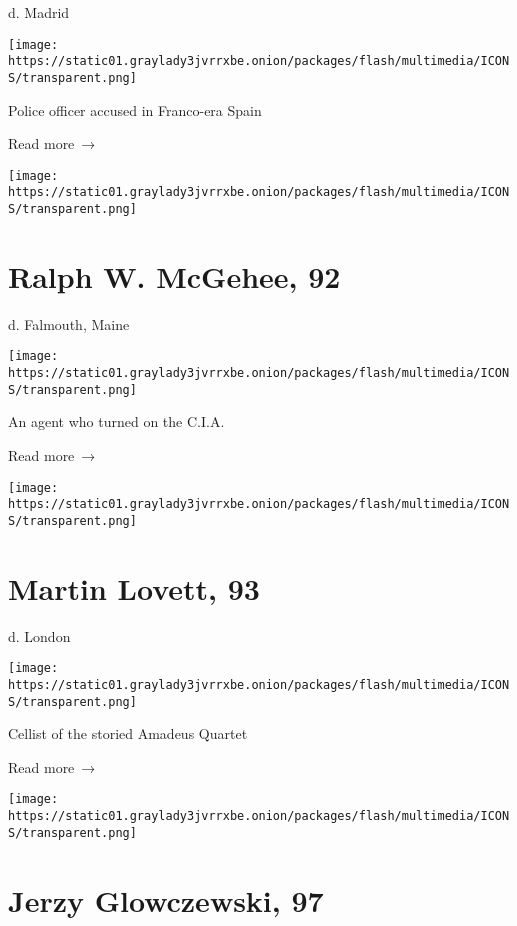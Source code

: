 d. Madrid

\texttt{[image: https://static01.graylady3jvrrxbe.onion/packages/flash/multimedia/ICONS/transparent.png]}

Police officer accused in Franco-era Spain

 Read more~→

\href{https://www.nytimes3xbfgragh.onion/2020/05/14/us/ralph-w-mcgehee-virus-lost.html}{}

\texttt{[image: https://static01.graylady3jvrrxbe.onion/packages/flash/multimedia/ICONS/transparent.png]}

\hypertarget{ralph-w-mcgehee-92}{%
\section{Ralph W. McGehee, 92}\label{ralph-w-mcgehee-92}}

d. Falmouth, Maine

\texttt{[image: https://static01.graylady3jvrrxbe.onion/packages/flash/multimedia/ICONS/transparent.png]}

An agent who turned on the C.I.A.

 Read more~→

\href{https://www.nytimes3xbfgragh.onion/2020/05/14/obituaries/martin-lovett-dead-coronavirus.html}{}

\texttt{[image: https://static01.graylady3jvrrxbe.onion/packages/flash/multimedia/ICONS/transparent.png]}

\hypertarget{martin-lovett-93}{%
\section{Martin Lovett, 93}\label{martin-lovett-93}}

d. London

\texttt{[image: https://static01.graylady3jvrrxbe.onion/packages/flash/multimedia/ICONS/transparent.png]}

Cellist of the storied Amadeus Quartet

 Read more~→

\href{https://www.nytimes3xbfgragh.onion/2020/05/14/obituaries/jerzy-glowczewski-dead-coronavirus.html}{}

\texttt{[image: https://static01.graylady3jvrrxbe.onion/packages/flash/multimedia/ICONS/transparent.png]}

\hypertarget{jerzy-glowczewski-97}{%
\section{Jerzy Glowczewski, 97}\label{jerzy-glowczewski-97}}

